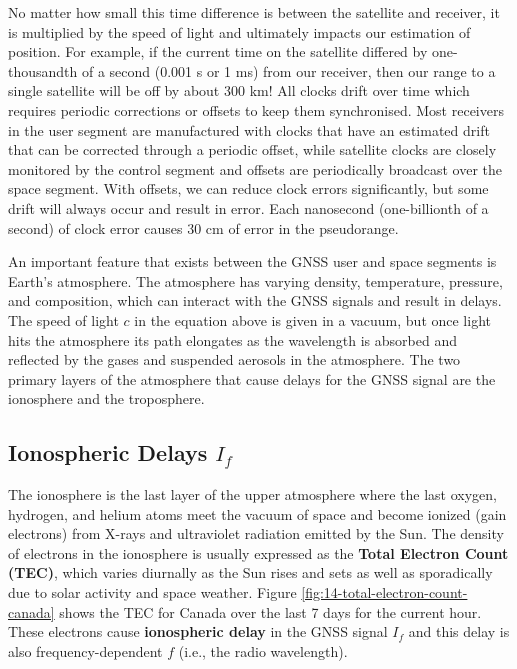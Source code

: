 \documentclass[
]{book}
\begin{document}
No matter how small this time difference is between the satellite and receiver, it is multiplied by the speed of light and ultimately impacts our estimation of position. For example, if the current time on the satellite differed by one-thousandth of a second (0.001 s or 1 ms) from our receiver, then our range to a single satellite will be off by about 300 km! All clocks drift over time which requires periodic corrections or offsets to keep them synchronised. Most receivers in the user segment are manufactured with clocks that have an estimated drift that can be corrected through a periodic offset, while satellite clocks are closely monitored by the control segment and offsets are periodically broadcast over the space segment. With offsets, we can reduce clock errors significantly, but some drift will always occur and result in error. Each nanosecond (one-billionth of a second) of clock error causes 30 cm of error in the pseudorange.

An important feature that exists between the GNSS user and space segments is Earth's atmosphere. The atmosphere has varying density, temperature, pressure, and composition, which can interact with the GNSS signals and result in delays. The speed of light \(c\) in the equation above is given in a vacuum, but once light hits the atmosphere its path elongates as the wavelength is absorbed and reflected by the gases and suspended aerosols in the atmosphere. The two primary layers of the atmosphere that cause delays for the GNSS signal are the ionosphere and the troposphere.

\subsection{\texorpdfstring{Ionospheric Delays \(I_f\)}{Ionospheric Delays I\_f}}\label{ionospheric-delays-i_f}

The ionosphere is the last layer of the upper atmosphere where the last oxygen, hydrogen, and helium atoms meet the vacuum of space and become ionized (gain electrons) from X-rays and ultraviolet radiation emitted by the Sun. The density of electrons in the ionosphere is usually expressed as the \textbf{Total Electron Count (TEC)}, which varies diurnally as the Sun rises and sets as well as sporadically due to solar activity and space weather. Figure \ref{fig:14-total-electron-count-canada} shows the TEC for Canada over the last 7 days for the current hour. These electrons cause \textbf{ionospheric delay} in the GNSS signal \(I_f\) and this delay is also frequency-dependent \(f\) (i.e., the radio wavelength).
\end{document}
